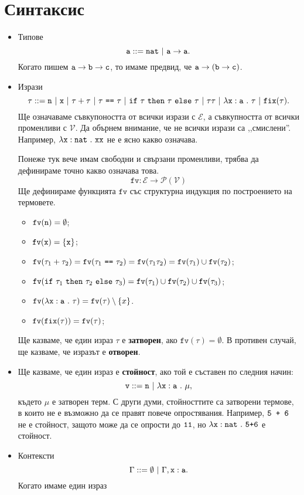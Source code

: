\section{Синтаксис}

\newcommand{\rename}[2]{\{\vv{#1}/\vv{#2}\}}

\newcommand{\fv}{\texttt{fv}}

\begin{itemize}
\item
  Типове
  \[\vv{a} ::= \vv{nat}\ |\ \vv{a} \to \vv{a}.\]
  Когато пишем
  $\texttt{a} \to \texttt{b} \to \texttt{c}$, то имаме предвид, че
  $\texttt{a} \to (\texttt{b} \to \texttt{c})$.
\item
  Изрази
  \[\tau ::= \vv{n}\ |\ \vv{x}\ |\ \tau + \tau\ |\ \tau\ \vv{==}\ \tau\ |\ \ifelse{\tau}{\tau}{\tau}\ |\ \tau\tau\ |\ \lamb{x}{a}{\tau}\ |\ \fix(\tau).\]
  Ще означаваме съвкупоността от всички изрази с $\mathcal{E}$, а съвкупността от всички променливи с $\mathcal{V}$.
  Да обърнем внимание, че не всички изрази са ,,смислени''. Например,
  $\lambda\texttt{x}:\texttt{nat}\ .\ {\texttt{xx}}$ не е ясно какво означава.
  
  Понеже тук вече имам свободни и свързани променливи, трябва да дефинираме точно какво означава това.
  \[\fv:\mathcal{E} \to \mathcal{P}(\mathcal{V})\]
  Ще дефинираме функцията $\texttt{fv}$ със структурна индукция по построението на термовете.
  
  \begin{itemize}
  \item
    $\fv(\vv{n}) = \emptyset$;
  \item
    $\fv(\vv{x}) = \{\vv{x}\}$;
  \item
    $\fv(\tau_1 + \tau_2) = \fv(\tau_1\ \vv{==}\ \tau_2) = \fv(\tau_1\tau_2) = \fv(\tau_1) \cup \fv(\tau_2)$;
  \item
    $\fv(\ifelse{\tau_1}{\tau_2}{\tau_3}) = \fv(\tau_1) \cup \fv(\tau_2) \cup \fv(\tau_3)$;
  \item
    $\fv(\lamb{x}{a}{\tau}) = \fv(\tau) \setminus \{x\}$.
  \item
    $\fv(\fix(\tau)) = \fv(\tau)$;
  \end{itemize}
  
  Ще казваме, че един израз $\tau$ е {\bf затворен}, ако $\fv(\tau) = \emptyset$.
  В противен случай, ще казваме, че изразът е {\bf отворен}.
\item
  Ще казваме, че един израз е {\bf стойност}, ако той е съставен по следния начин:
  \[\vv{v} ::= \vv{n}\ |\ \lamb{x}{a}{\mu},\]
  където $\mu$ е затворен терм.
  С други думи, стойносттите са затворени термове, в които не е възможно да се правят повече опростявания.
  Например, $\texttt{5 + 6}$ не е стойност, защото може да се опрости до $\texttt{11}$,
  но $\lambda\texttt{x}:\texttt{nat}\ .\ {\texttt{5+6}}$ е стойност.
\item
  Контексти
  \[\Gamma ::= \emptyset\ |\ \Gamma,\type{x}{a}.\]
  Когато имаме един израз 
\end{itemize}

